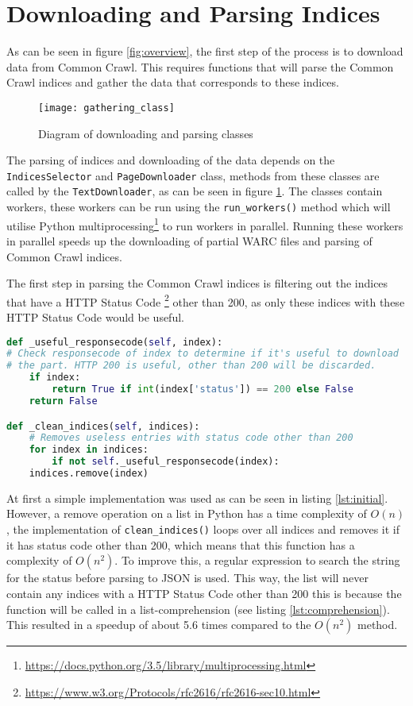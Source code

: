 \section{Downloading and Parsing Indices}\label{sec:5-downloading}

As can be seen in figure \ref{fig:overview}, the first step of the process is to download data from Common Crawl. This requires functions that will parse the Common Crawl indices and gather the data that corresponds to these indices. 

\begin{figure}[H]
\centering
\texttt{[image: gathering\_class]}
\caption{Diagram of downloading and parsing classes}
\label{fig:gathering_class}
\end{figure}

The parsing of indices and downloading of the data depends on the \texttt{IndicesSelector} and \texttt{PageDownloader} class, methods from these classes are called by the \texttt{TextDownloader}, as can be seen in figure \ref{fig:gathering_class}. The classes contain workers, these workers can be run  using the \texttt{run\_workers()} method which will utilise Python multiprocessing\footnote{\url{https://docs.python.org/3.5/library/multiprocessing.html}} to run workers in parallel. Running these workers in parallel speeds up the downloading of partial WARC files and parsing of Common Crawl indices.

The first step in parsing the Common Crawl indices is filtering out the indices that have a HTTP Status Code \footnote{\url{https://www.w3.org/Protocols/rfc2616/rfc2616-sec10.html}} other than 200, as only these indices with these HTTP Status Code would be useful. 

\begin{lstlisting}[language=Python, caption=Initial implementation, label={lst:initial}]
def _useful_responsecode(self, index):
# Check responsecode of index to determine if it's useful to download
# the part. HTTP 200 is useful, other than 200 will be discarded.
    if index:
        return True if int(index['status']) == 200 else False
    return False

def _clean_indices(self, indices):
    # Removes useless entries with status code other than 200
    for index in indices:
        if not self._useful_responsecode(index):
    indices.remove(index)
\end{lstlisting}

At first a simple implementation was used as can be seen in listing \ref{lst:initial}. However, a remove operation on a list in Python has a time complexity of $O(n)$, the implementation of \texttt{clean\_indices()} loops over all indices and removes it if it has status code other than 200, which means that this function has a complexity of $O(n^2)$. To improve this, a regular expression to search the string for the status before parsing to JSON is used. This way, the list will never contain any indices with a HTTP Status Code other than 200 this is because the function will be called in a list-comprehension (see listing \ref{lst:comprehension}). This resulted in a speedup of about 5.6 times compared to the $O(n^2)$ method.



